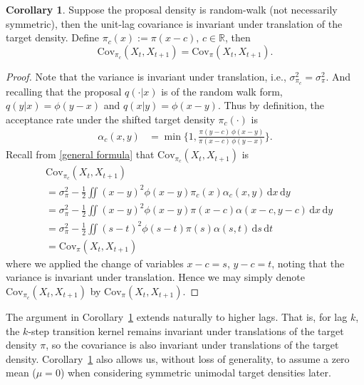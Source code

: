 \documentclass[conference]{IEEEtran}
\newcommand{\df}{\mathrm{d}}
\theoremstyle{definition}
\newtheorem{corollary}[theorem]{Corollary}
\begin{document}
\begin{corollary}\label{invariance}Suppose the proposal density is random-walk (not necessarily symmetric), then the unit-lag covariance is invariant under translation of the target density. Define $\pi_c(x):=\pi(x-c),\,c\in\mathbb{R}$, then
\[
\mathrm{Cov}_{\pi_c}(X_t,X_{t+1})=\mathrm{Cov}_{\pi}(X_t,X_{t+1}).
\]
\begin{proof}
Note that the variance is invariant under translation, i.e.,
$\sigma^2_{\pi_c} = \sigma^2_\pi$.
And recalling that the proposal $q(\cdot|x)$ is of the random walk form, $q(y|x)=\phi(y-x)$ and \(q(x|y)=\phi(x-y)\). Thus by definition, the acceptance rate under the shifted target density \(\pi_c(\cdot)\) is
\begin{align*}
    \alpha_c(x,y)
    &= \min\bigg\{1,\frac{\pi(y-c)\,\phi(x-y)}{\pi(x-c)\,\phi(y-x)}\bigg\}.
\end{align*}
Recall from \eqref{general formula} that 
$\mathrm{Cov}_{\pi_c}(X_t,X_{t+1})$ is 
\begin{align*}
    &\mathrm{Cov}_{\pi_c}(X_t,X_{t+1})\\
    &= \sigma_{\pi}^2 - \tfrac{1}{2}\iint (x-y)^2 \phi(x-y)\pi_c(x)\alpha_c(x,y)\,\df x\,\df y \\
    &=\sigma_{\pi}^2 - \tfrac{1}{2}\iint (x-y)^2 \phi(x-y)\pi(x-c)\alpha(x-c,y-c)\,\df x\,\df y\\
    &=  \sigma_{\pi}^2 - \tfrac{1}{2}\iint (s-t)^2 \phi(s-t)\pi(s)\alpha(s,t)\,\df s\,\df t\\&=\mathrm{Cov}_{\pi}(X_t,X_{t+1})
\end{align*}
where we applied the change of variables $x-c=s$, $y-c=t$, noting that the variance is invariant under translation. 
Hence we may simply denote $\mathrm{Cov}_{\pi_c}(X_t,X_{t+1})$ by $\mathrm{Cov}_{\pi}(X_t,X_{t+1})$.
\end{proof}    
\end{corollary}

The argument in Corollary~\ref{invariance} extends naturally to higher lags. That is, for lag $k$, the $k$-step transition kernel remains invariant 
under translations of the target density $\pi$, 
so the covariance is also invariant under translations of the target density. Corollary~\ref{invariance} also allows us, without loss of generality, to assume a zero mean ($\mu=0$) when considering symmetric unimodal target densities later.
\end{document}
